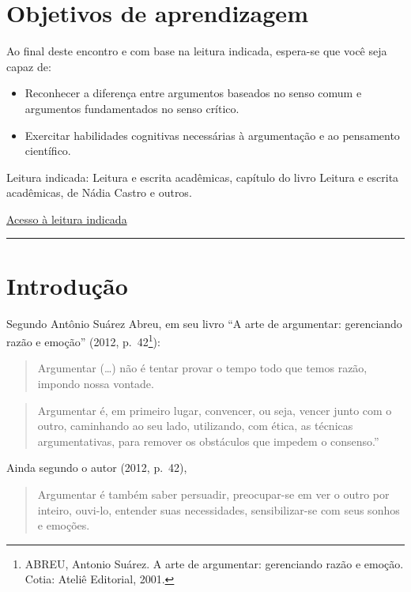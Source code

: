 \documentclass[
]{book}
\begin{document}
\section{Objetivos de aprendizagem}\label{objetivos-de-aprendizagem-2}

Ao final deste encontro e com base na leitura indicada, espera-se que você seja capaz de:

\begin{itemize}
\item
  Reconhecer a diferença entre argumentos baseados no senso comum e argumentos fundamentados no senso crítico.
\item
  Exercitar habilidades cognitivas necessárias à argumentação e ao pensamento científico.
\end{itemize}

Leitura indicada:
Leitura e escrita acadêmicas, capítulo do livro Leitura e escrita acadêmicas, de Nádia Castro e outros.

\href{vbk://9788533500228/page/11}{Acesso à leitura indicada}

\begin{center}\rule{0.5\linewidth}{0.5pt}\end{center}

\section{Introdução}\label{introduuxe7uxe3o-1}

Segundo Antônio Suárez Abreu, em seu livro ``A arte de argumentar: gerenciando razão e emoção'' (2012, p.~42\footnote{ABREU, Antonio Suárez. A arte de argumentar: gerenciando razão e emoção. Cotia: Ateliê Editorial,
  2001.}):

\begin{quote}
Argumentar (\ldots) não é tentar provar o tempo todo que temos razão, impondo nossa vontade.
\end{quote}

\begin{quote}
Argumentar é, em primeiro lugar, convencer, ou seja, vencer junto com o outro, caminhando ao seu lado, utilizando, com ética, as técnicas argumentativas, para remover os obstáculos que impedem o consenso.''
\end{quote}

Ainda segundo o autor (2012, p.~42),

\begin{quote}
Argumentar é também saber persuadir, preocupar-se em ver o outro por inteiro, ouvi-lo, entender suas necessidades, sensibilizar-se com seus sonhos e emoções.
\end{quote}
\end{document}
